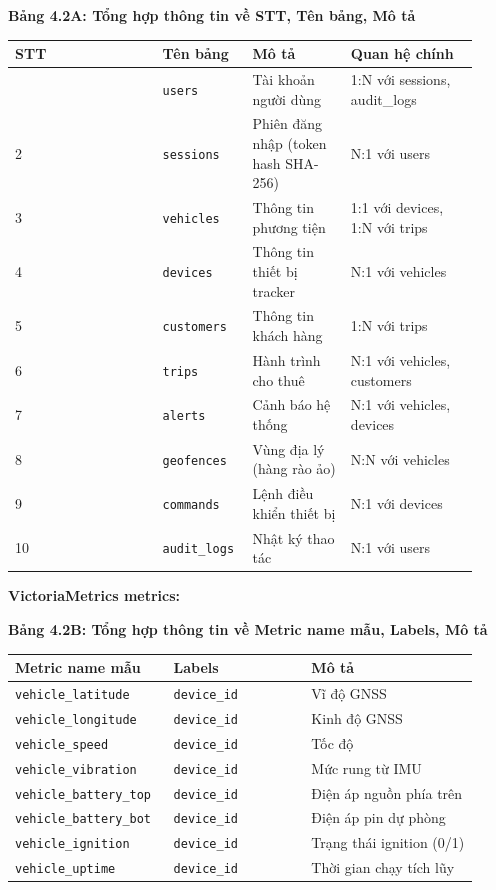\documentclass[13pt,a4paper]{extarticle}
\newcounter{none} %
\newcommand{\thesislongtableorignewline}{}
\let\thesislongtableorignewline\\
\renewcommand{\\}{\thesislongtableorignewline\hline}%
\let\\\thesislongtableorignewline
\newcommand{\thesistabletitle}[1]{%
  \begin{center}\textbf{#1}\end{center}%
}
\begin{document}
{\def\LTcaptype{none} %
\thesistabletitle{Bảng 4.2A: Tổng hợp thông tin về STT, Tên bảng, Mô tả}

\begin{longtable}{|p{0.30\linewidth}|p{0.16\linewidth}|p{0.20\linewidth}|p{0.26\linewidth}|}
\hline \textbf{STT} & \textbf{Tên bảng} & \textbf{Mô tả} & \textbf{Quan hệ chính} \\
\hline
\endhead
\hline
\endlastfoot
1 & \texttt{users} & Tài khoản người dùng & 1:N với sessions,
audit\_logs \\
2 & \texttt{sessions} & Phiên đăng nhập (token hash SHA-256) & N:1 với
users \\
3 & \texttt{vehicles} & Thông tin phương tiện & 1:1 với devices, 1:N với
trips \\
4 & \texttt{devices} & Thông tin thiết bị tracker & N:1 với vehicles \\
5 & \texttt{customers} & Thông tin khách hàng & 1:N với trips \\
6 & \texttt{trips} & Hành trình cho thuê & N:1 với vehicles,
customers \\
7 & \texttt{alerts} & Cảnh báo hệ thống & N:1 với vehicles, devices \\
8 & \texttt{geofences} & Vùng địa lý (hàng rào ảo) & N:N với vehicles \\
9 & \texttt{commands} & Lệnh điều khiển thiết bị & N:1 với devices \\
10 & \texttt{audit\_logs} & Nhật ký thao tác & N:1 với users \\
\end{longtable}
}

\textbf{VictoriaMetrics metrics:}

{\def\LTcaptype{none} %
\thesistabletitle{Bảng 4.2B: Tổng hợp thông tin về Metric name mẫu, Labels, Mô tả}

\begin{longtable}{|p{0.30\linewidth}|p{0.28\linewidth}|p{0.34\linewidth}|}
\hline \textbf{Metric name mẫu} & \textbf{Labels} & \textbf{Mô tả} \\
\hline
\endhead
\hline
\endlastfoot
\texttt{vehicle\_latitude} & \texttt{device\_id} & Vĩ độ GNSS \\
\texttt{vehicle\_longitude} & \texttt{device\_id} & Kinh độ GNSS \\
\texttt{vehicle\_speed} & \texttt{device\_id} & Tốc độ \\
\texttt{vehicle\_vibration} & \texttt{device\_id} & Mức rung từ IMU \\
\texttt{vehicle\_battery\_top} & \texttt{device\_id} & Điện áp nguồn
phía trên \\
\texttt{vehicle\_battery\_bot} & \texttt{device\_id} & Điện áp pin dự
phòng \\
\texttt{vehicle\_ignition} & \texttt{device\_id} & Trạng thái ignition
(0/1) \\
\texttt{vehicle\_uptime} & \texttt{device\_id} & Thời gian chạy tích
lũy \\
\end{longtable}
}
\end{document}
